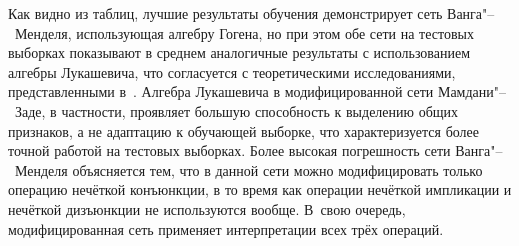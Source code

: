 Как видно из таблиц, лучшие результаты обучения демонстрирует сеть
Ванга"--~Менделя, использующая алгебру Гогена, но при этом обе сети на тестовых
выборках показывают в среднем аналогичные результаты с использованием
алгебры Лукашевича, что согласуется с теоретическими исследованиями,
представленными в~\cite{soldat:bib4}. Алгебра Лукашевича в модифицированной сети
Мамдани"--~Заде, в частности, проявляет большую способность к выделению общих
признаков, а не адаптацию к обучающей выборке, что характеризуется более
точной работой на тестовых выборках. Более высокая погрешность сети
Ванга"--~Менделя объясняется тем, что в данной сети можно модифицировать только
операцию нечёткой конъюнкции, в то время как операции нечёткой импликации и
нечёткой дизъюнкции не используются вообще. В~свою очередь, модифицированная
сеть применяет интерпретации всех трёх операций.



